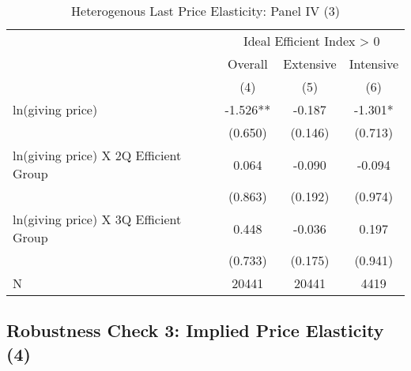 \documentclass[ review  , 3p ]{elsarticle}
\begin{document}
  \begin{table}

  \caption{\label{tab:kableHeteroShortElasticitySlide3}Heterogenous Last Price Elasticity: Panel IV (3)}
  \centering
  \fontsize{8}{10}\selectfont
  \begin{tabular}[t]{lccc}
  \toprule
  \multicolumn{1}{c}{ } & \multicolumn{3}{c}{Ideal Efficient Index > 0} \\
  \cmidrule(l{3pt}r{3pt}){2-4}
  \multicolumn{1}{c}{ } & \multicolumn{1}{c}{Overall} & \multicolumn{1}{c}{Extensive} & \multicolumn{1}{c}{Intensive} \\
  \cmidrule(l{3pt}r{3pt}){2-2} \cmidrule(l{3pt}r{3pt}){3-3} \cmidrule(l{3pt}r{3pt}){4-4}
   & (4) & (5) & (6)\\
  \midrule
  ln(giving price) & -1.526** & -0.187 & -1.301*\\
   & (0.650) & (0.146) & (0.713)\\
  ln(giving price) X 2Q Efficient Group & 0.064 & -0.090 & -0.094\\
   & (0.863) & (0.192) & (0.974)\\
  ln(giving price) X 3Q Efficient Group & 0.448 & -0.036 & 0.197\\
   & (0.733) & (0.175) & (0.941)\\
  N & 20441 & 20441 & 4419\\
  \bottomrule
  \end{tabular}
  \end{table}

  \hypertarget{robustness-check-3-implied-price-elasticity-4}{%
  \subsection{Robustness Check 3: Implied Price Elasticity (4)}\label{robustness-check-3-implied-price-elasticity-4}}
\end{document}
